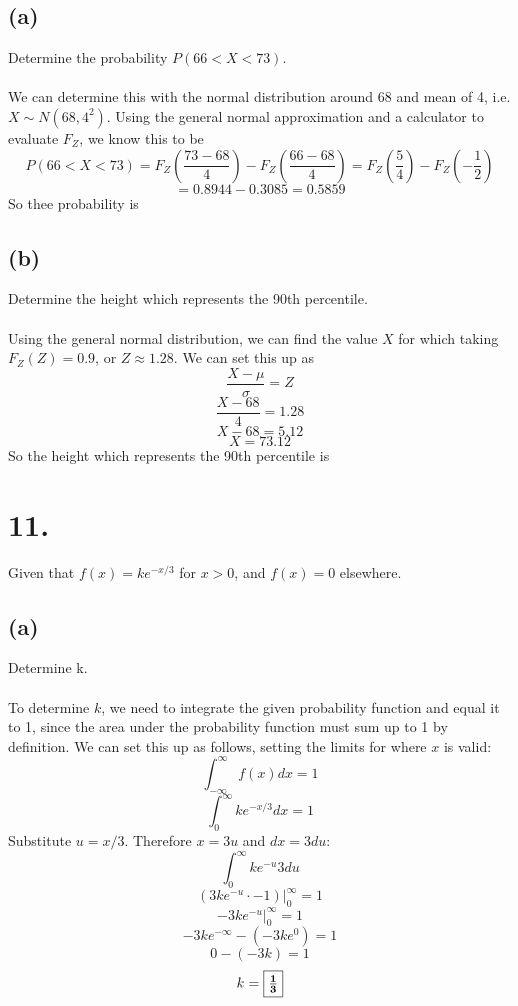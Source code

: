 \documentclass{article}
\begin{document}
{\subsection*{(a)} 
Determine the probability \( P(66 < X < 73) \).
\\
\\
We can determine this with the normal distribution around 68 and mean of 4, i.e. \( X \sim N(68, 4^2) \). Using the general normal approximation and a calculator to evaluate \(F_Z\), we know this to be 
\[
P(66 < X < 73) = F_Z(\frac{73 - 68}{4}) - F_Z(\frac{66 - 68}{4}) = F_Z(\frac{5}{4}) - F_Z(-\frac{1}{2})
\]
\[
= 0.8944 - 0.3085 = 0.5859
\]
So thee probability is 

\subsection*{(b)} 
Determine the height which represents the 90th percentile.
\\
\\
Using the general normal distribution, we can find the value \(X\) for which taking \(F_Z(Z) = 0.9\), or \(Z \approx 1.28 \). We can set this up as 
\[
\frac{X - \mu}{\sigma} = Z
\]
\[
\frac{X - 68}{4} = 1.28
\]
\[
X - 68 = 5.12
\]
\[
X = 73.12
\]
So the height which represents the 90th percentile is 

\section*{11.}
Given that \( f(x) = ke^{-x/3} \) for \( x > 0 \), and \( f(x) = 0 \) elsewhere.

\subsection*{(a)} 
Determine k.
\\
\\
To determine \( k \), we need to integrate the given probability function and equal it to 1, since the area under the probability function must sum up to 1 by definition. We can set this up as follows, setting the limits for where \(x\) is valid:
\[
\int_{-\infty}^{\infty} f(x) dx = 1
\]
\[
\int_{0}^{\infty} ke^{-x/3} dx = 1
\]
Substitute \( u = x/3 \). Therefore \(x = 3u\) and \(dx = 3du\):
\[
\int_{0}^{\infty} ke^{-u} 3 du
\]
\[
(3ke^{-u} \cdot -1) \Big|_{0}^{\infty} = 1
\]
\[
-3ke^{-u} \Big|_{0}^{\infty} = 1
\]
\[
-3ke^{-\infty} - (-3ke^{0}) = 1
\]
\[
0 - (-3k) = 1
\]
\[
k = \fbox{\(\mathbf{ \frac{1}{3}}\)}
\]

}
\end{document}
